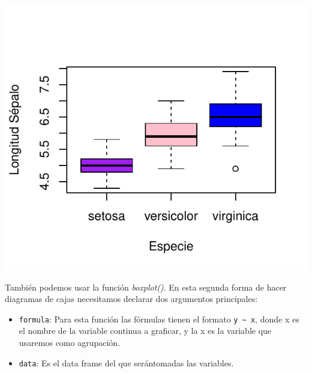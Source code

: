 \documentclass[
]{book}
\newenvironment{Shaded}{\begin{snugshade}}{\end{snugshade}}
\newcommand{\AttributeTok}[1]{\textcolor[rgb]{0.13,0.29,0.53}{#1}}
\newcommand{\FunctionTok}[1]{\textcolor[rgb]{0.13,0.29,0.53}{\textbf{#1}}}
\newcommand{\NormalTok}[1]{#1}
\newcommand{\SpecialCharTok}[1]{\textcolor[rgb]{0.81,0.36,0.00}{\textbf{#1}}}
\newcommand{\StringTok}[1]{\textcolor[rgb]{0.31,0.60,0.02}{#1}}
\begin{document}
\begin{Shaded}
\end{Shaded}

\begin{center}\includegraphics{R_Manual_files/figure-latex/unnamed-chunk-194-1} \end{center}

También podemos usar la función \emph{boxplot()}.
En esta segunda forma de hacer diagramas de cajas necesitamos declarar dos argumentos principales:

\begin{itemize}
\item
  \texttt{formula}: Para esta función las fórmulas tienen el formato \texttt{y\ \textasciitilde{}\ x}, donde x es el nombre de la variable continua a graficar, y la x es la variable que usaremos como agrupación.
\item
  \texttt{data}: Es el data frame del que serántomadas las variables.
\end{itemize}
\end{document}
